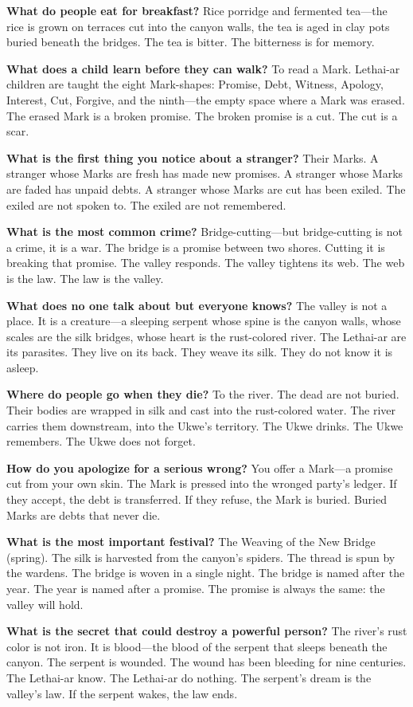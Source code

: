 \vspace{1em}

\begin{almanac}
\textbf{What do people eat for breakfast?} Rice porridge and fermented tea---the rice is grown on terraces cut into the canyon walls, the tea is aged in clay pots buried beneath the bridges. The tea is bitter. The bitterness is for memory.

\textbf{What does a child learn before they can walk?} To read a Mark. Lethai-ar children are taught the eight Mark-shapes: Promise, Debt, Witness, Apology, Interest, Cut, Forgive, and the ninth---the empty space where a Mark was erased. The erased Mark is a broken promise. The broken promise is a cut. The cut is a scar.

\textbf{What is the first thing you notice about a stranger?} Their Marks. A stranger whose Marks are fresh has made new promises. A stranger whose Marks are faded has unpaid debts. A stranger whose Marks are cut has been exiled. The exiled are not spoken to. The exiled are not remembered.

\textbf{What is the most common crime?} Bridge-cutting---but bridge-cutting is not a crime, it is a war. The bridge is a promise between two shores. Cutting it is breaking that promise. The valley responds. The valley tightens its web. The web is the law. The law is the valley.

\textbf{What does no one talk about but everyone knows?} The valley is not a place. It is a creature---a sleeping serpent whose spine is the canyon walls, whose scales are the silk bridges, whose heart is the rust-colored river. The Lethai-ar are its parasites. They live on its back. They weave its silk. They do not know it is asleep.

\textbf{Where do people go when they die?} To the river. The dead are not buried. Their bodies are wrapped in silk and cast into the rust-colored water. The river carries them downstream, into the Ukwe's territory. The Ukwe drinks. The Ukwe remembers. The Ukwe does not forget.

\textbf{How do you apologize for a serious wrong?} You offer a Mark---a promise cut from your own skin. The Mark is pressed into the wronged party's ledger. If they accept, the debt is transferred. If they refuse, the Mark is buried. Buried Marks are debts that never die.

\textbf{What is the most important festival?} The Weaving of the New Bridge (spring). The silk is harvested from the canyon's spiders. The thread is spun by the wardens. The bridge is woven in a single night. The bridge is named after the year. The year is named after a promise. The promise is always the same: the valley will hold.

\textbf{What is the secret that could destroy a powerful person?} The river's rust color is not iron. It is blood---the blood of the serpent that sleeps beneath the canyon. The serpent is wounded. The wound has been bleeding for nine centuries. The Lethai-ar know. The Lethai-ar do nothing. The serpent's dream is the valley's law. If the serpent wakes, the law ends.
\end{almanac}

\newpage

\newpage
